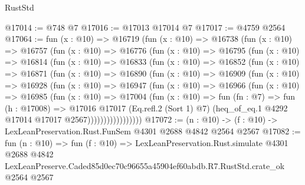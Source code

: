 \begin{lexlean}{RustStd}
\begin{coremodule}
@17014 := @748 @7
@17016 := @17013 @17014 @7
@17017 := @4759 @2564
@17064 := fun (x : @10) =>
  @16719
    (fun (x : @10) =>
    @16738
      (fun (x : @10) =>
      @16757
        (fun (x : @10) =>
        @16776
          (fun (x : @10) =>
          @16795
            (fun (x : @10) =>
            @16814
              (fun (x : @10) =>
              @16833
                (fun (x : @10) =>
                @16852
                  (fun (x : @10) =>
                  @16871
                    (fun (x : @10) =>
                    @16890
                      (fun (x : @10) =>
                      @16909
                        (fun (x : @10) =>
                        @16928
                          (fun (x : @10) =>
                          @16947
                            (fun (x : @10) =>
                            @16966
                              (fun (x : @10) =>
                              @16985
                                (fun (x : @10) =>
                                @17004
                                  (fun (x : @10) =>
                                  fun (fn : @7) =>
                                  fun (h : @17008) =>
                                  @17016
                                    @17017
                                    (Eq.refl.{2} (Sort 1) @7)
                                    (heq_of_eq.{1} @4292 @17014 @17017 @2567)))))))))))))))))
@17072 := (n : @10) -> (f : @10) -> LexLeanPreservation.Rust.FunSem @4301 @2688 @4842 @2564 @2567
@17082 := fun (n : @10) =>
  fun (f : @10) =>
  LexLeanPreservation.Rust.simulate
    @4301
    @2688
    @4842
    LexLeanPreserve.Caded85d0ec70c96655a45904ef60abdb.R7.RustStd.crate_ok
    @2564
    @2567
\end{coremodule}
\end{lexlean}
